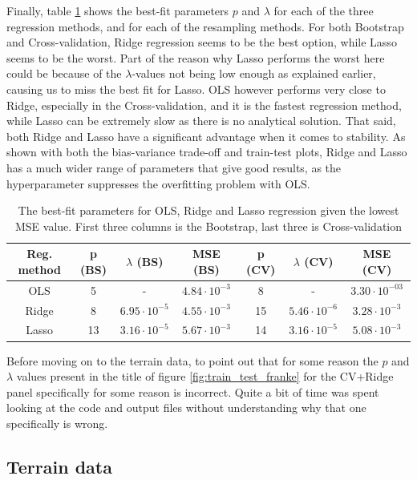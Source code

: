 \documentclass[a4paper]{article}
\begin{document}
Finally, table \ref{tab:best_fit_franke} shows the best-fit parameters $p$ and $\lambda$ for each of the three regression methods, and for each of the resampling methods. For both Bootstrap and Cross-validation, Ridge regression seems to be the best option, while Lasso seems to be the worst. Part of the reason why Lasso performs the worst here could be because of the $\lambda$-values not being low enough as explained earlier, causing us to miss the best fit for Lasso. OLS however performs very close to Ridge, especially in the Cross-validation, and it is the fastest regression method, while Lasso can be extremely slow as there is no analytical solution. That said, both Ridge and Lasso have a significant advantage when it comes to stability. As shown with both the bias-variance trade-off and train-test plots, Ridge and Lasso has a much wider range of parameters that give good results, as the hyperparameter suppresses the overfitting problem with OLS.
\begin{table}[H]
  \centering
  \caption{The best-fit parameters for OLS, Ridge and Lasso regression given the lowest MSE value. First three columns is the Bootstrap, last three is Cross-validation}
  \label{tab:best_fit_franke}
  \begin{tabular}{c|c|c|c||c|c|c}
    Reg. method & p (BS)& $\lambda$ (BS) & MSE (BS) & p (CV) & $\lambda$ (CV) & MSE (CV) \\\hline
    OLS & 5 & - & $4.84\cdot10^{-3}$ & 8 & - & $3.30\cdot10^{-03}$\\
    Ridge & 8 & $6.95\cdot10^{-5}$ & $4.55\cdot10^{-3}$ & 15 & $5.46\cdot10^{-6}$ & $3.28\cdot10^{-3}$\\
    Lasso & 13 & $3.16\cdot10^{-5}$ &$5.67\cdot10^{-3}$ & 14 & $3.16\cdot10^{-5}$ & $5.08\cdot10^{-3}$
    \end{tabular}
\end{table}
Before moving on to the terrain data, to point out that for some reason the $p$ and $\lambda$ values present in the title of figure \ref{fig:train_test_franke} for the CV+Ridge panel specifically for some reason is incorrect. Quite a bit of time was spent looking at the code and output files without understanding why that one specifically is wrong.
\subsection{Terrain data}
\end{document}
